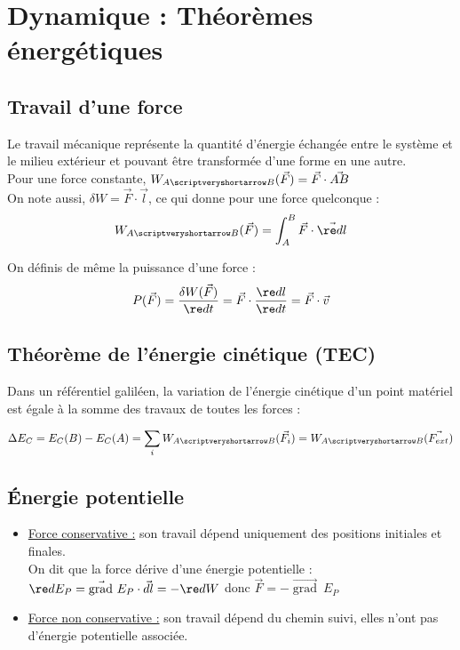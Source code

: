 \documentclass[13pt, twoside, a4paper, french]{report}
\begin{document}
    \chapter{Dynamique : Théorèmes énergétiques}\label{ch:dynamique-theoremes-energetiques}


        \section{Travail d’une force}\label{sec:travail-dune-force}

            Le travail mécanique représente la quantité d’énergie échangée entre le système et le milieu extérieur et pouvant être transformée d’une forme en une autre.\\

            Pour une force constante, $W_{A\scriptveryshortarrow B}(\vec F) = \vec F \cdot \vec{AB}$\\

            On note aussi, $\delta W = \vec F \cdot \vec l$, ce qui donne pour une force quelconque :\\
            \[ W_{A\scriptveryshortarrow B}(\vec F) = \int_A^B \vec F \cdot \vec{\re dl} \]

            On définis de même la puissance d'une force :\\
            \[ P(\vec F) = \dfrac{\delta W(\vec F)}{\re d t} = \vec F \cdot \dfrac{\re dl}{\re dt} = \vec F \cdot \vec v \]


        \section{Théorème de l'énergie cinétique (TEC)}\label{sec:theoreme-de-l'energie-cinetique-(tec)}

            Dans un référentiel galiléen, la variation de l'énergie cinétique d'un point matériel est égale à la somme des travaux de toutes les forces :

            \[\Delta E_C = E_C(B) - E_C(A) = \sum_i W_{A \scriptveryshortarrow B}(\vec{F_i}) = W_{A \scriptveryshortarrow B}(\vec{F_{ext}})\]


        \section{Énergie potentielle}\label{sec:energie-potentielle}


            \begin{itemize}
                \item \underline{Force conservative :} son travail dépend uniquement des positions initiales et finales.\\
                On dit que la force dérive d'une énergie potentielle : $\re d E_P = \vec{\operatorname{grad}}\ E_P \cdot \vec{d l} = -\re d W$ donc $\vec F = - \vec{\operatorname{grad}}\ E_P$\\
                \item \underline{Force non conservative :} son travail dépend du chemin suivi, elles n'ont pas d'énergie potentielle associée.
            \end{itemize}
\end{document}
